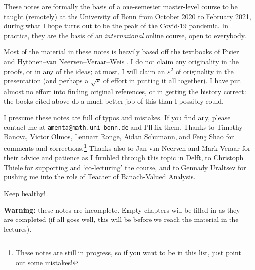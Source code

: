 These notes are formally the basis of a one-semester master-level course to be taught (remotely) at the University of Bonn from October 2020 to February 2021, during what I hope turns out to be the peak of the Covid-19 pandemic.
In practice, they are the basis of an \emph{international} online course, open to everybody.

Most of the material in these notes is heavily based off the textbooks of Pisier \cite{gP16} and Hyt\"onen--van Neerven--Veraar--Weis \cite{HNVW16, HNVW17}.
I do not claim any originality in the proofs, or in any of the ideas; at most, I will claim an $\varepsilon^2$ of originality in the presentation (and perhaps a $\sqrt{\varepsilon}$ of effort in putting it all together).
I have put almost no effort into finding original references, or in getting the history correct: the books cited above do a much better job of this than I possibly could.

\vspace{1cm}

I presume these notes are full of typos and mistakes.
If you find any, please contact me at \texttt{amenta@math.uni-bonn.de} and I'll fix them.
Thanks to Timothy Banova, Victor Olmos, Lennart Ronge, Aidan Schumann, and Feng Shao for comments and corrections.\footnote{These notes are still in progress, so if you want to be in this list, just point out some mistakes!}
Thanks also to Jan van Neerven and Mark Veraar for their advice and patience as I fumbled through this topic in Delft, to Christoph Thiele for supporting and `co-lecturing' the course, and to Gennady Uraltsev for pushing me into the role of Teacher of Banach-Valued Analysis.

\vspace{0.5cm}

Keep healthy! 




\vspace{1cm}

\textbf{Warning:} these notes are incomplete.
Empty chapters will be filled in as they are completed (if all goes well, this will be before we reach the material in the lectures).

